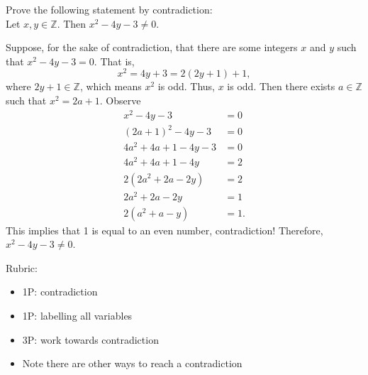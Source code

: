 \documentclass{article}
\newcommand{\Z}{\mathbb{Z}}
\theoremstyle{definition}
\begin{document}
\begin{question}{5}
    Prove the following statement by contradiction:\\
    Let $x, y\in \Z$. Then $x^2-4y-3\neq 0$.
\end{question}
\begin{solution}
Suppose, for the sake of contradiction, that there are some integers $x$ and $y$ such that $x^2 - 4y - 3 = 0$. That is,
	\[ x^2 = 4y+3 = 2(2y+1)+1, \]
where $2y+1\in \Z$, which means $x^2$ is odd. Thus, $x$ is odd. Then there exists $a\in \Z$ such that $x^2=2a+1$. Observe 
\begin{align*}
x^2 - 4y - 3 & = 0\\
(2a+1)^2 -4y -3 &= 0\\
4a^2+4a+1 -4y -3 & = 0\\
4a^2+4a+1 -4y & = 2\\
2(2a^2+2a - 2y) & = 2\\
2a^2+2a - 2y & = 1\\
2(a^2+a - y) & = 1.
\end{align*}
This implies that 1 is equal to an even number, contradiction! Therefore, $x^2-4y-3\neq 0$.

{\color{red} Rubric:
\begin{itemize}
\item 1P: contradiction
\item 1P: labelling all variables
\item 3P: work towards contradiction
\item Note there are other ways to reach a contradiction
\end{itemize}}
\end{solution}
\end{document}
